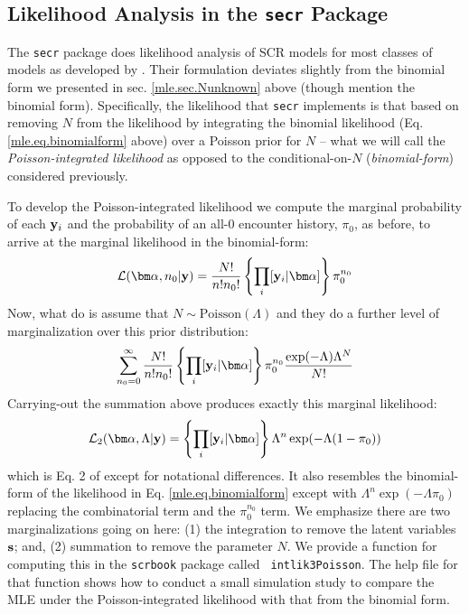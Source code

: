 \begin{comment}
As an
exercise, run this analysis for 30 and 40 km buffers and compare those
found in section 4.6 under {\bf WinBUGS}.  
NOTE: The function \mbox{\tt
  secr.fit} 
will return a
warning when the buffer size appears to be too small.  This is useful
particularly with the different units being used between programs and
packages.
\end{comment}

\subsection{Likelihood Analysis in the \mbox{\tt secr} Package}
\label{mle.sec.secrguts}

The \mbox{\tt secr} package does likelihood analysis of SCR models for
most classes of models as developed by
\citet{borchers_efford:2008}. Their formulation deviates slightly from
the binomial form we presented in sec.  \ref{mle.sec.Nunknown} above
(though \citet{borchers_efford:2008} mention the binomial form).
Specifically, the likelihood that \mbox{\tt secr} implements is that
based on removing $N$ from the likelihood by integrating the binomial
likelihood (Eq.  \ref{mle.eq.binomialform} above) over a Poisson prior
for $N$ -- what we will call the {\it Poisson-integrated likelihood} as
opposed to the conditional-on-$N$ ({\it binomial-form}) considered
previously.

To develop the Poisson-integrated likelihood 
we compute the marginal
probability of each ${\bf y}_{i}$ and the probability of an all-0
encounter history, $\pi_{0}$, as before, 
to arrive at the  marginal likelihood in the binomial-form:
\[
 {\cal L}({\bm \alpha},n_{0} | {\bf y})  = \frac{N!}{n! n_{0}!} 
 \left\{ \prod_{i}  [{\bf y}_{i}|{\bm \alpha}] 
\right\}
 \pi_{0}^{n_{0}}
\]
Now, what \citet{borchers_efford:2008} do is
assume that $N \sim \mbox{Poisson}(\Lambda)$ and they do a further level
of marginalization over this prior distribution:
\[
\sum_{n_{0}=0}^{\infty}  
\frac{N!}{n! n_{0}!} 
 \left\{ \prod_{i}  [{\bf y}_{i}|{\bm \alpha}] \right\}
 \pi_{0}^{n_{0}}
\frac{\exp(-\Lambda) \Lambda^{N}}{N!}
\]
Carrying-out the summation above produces exactly this marginal likelihood:
\[
{\cal L}_{2}({\bm \alpha}, \Lambda | {\bf y}) = 
 \left\{ \prod_{i}  [{\bf y}_{i}|{\bm \alpha}] \right\}  \Lambda^{n}   \exp( - \Lambda (1-\pi_{0}) )
\]
which is Eq. 2 of \citet{borchers_efford:2008} except for notational
differences. It also resembles the binomial-form of the likelihood in
Eq. \ref{mle.eq.binomialform} except with 
$\Lambda^{n}   \exp( - \Lambda \pi_{0} )$ replacing the combinatorial
term and the $\pi_{0}^{n_{0}}$ term. 
We emphasize there are two marginalizations
 going on here: (1) the
integration to remove the latent variables ${\bf s}$; and, (2) 
summation to remove the parameter $N$. 
We provide a function for
computing this in the \mbox{\tt scrbook} package called \mbox{\tt
  intlik3Poisson}. The help file for that function shows how to
conduct a small simulation study to compare the MLE under the
Poisson-integrated likelihood with that from the binomial form. 

